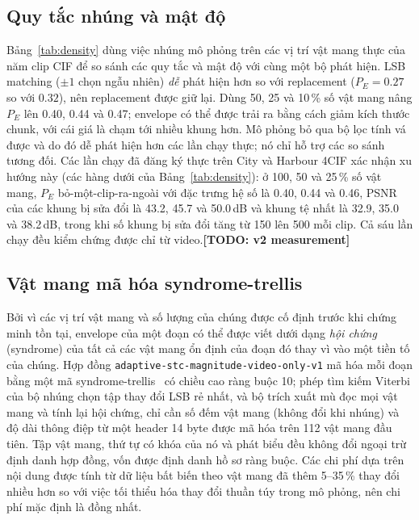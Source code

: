 \documentclass[journal]{IEEEtran}
\newcommand{\todo}[1]{\textbf{[TODO: #1]}}
\begin{document}
\subsection{Quy tắc nhúng và mật độ}
\label{sec:density}
Bảng~\ref{tab:density} dùng việc nhúng mô phỏng trên các vị trí vật mang thực
của năm clip CIF để so sánh các quy tắc và mật độ với cùng một bộ phát hiện.
LSB matching ($\pm1$ chọn ngẫu nhiên) \emph{dễ} phát hiện hơn so với
replacement ($P_E=0.27$ so với $0.32$), nên replacement được giữ lại. Dùng 50,
25 và 10\,\% số vật mang nâng $P_E$ lên 0.40, 0.44 và 0.47; envelope có thể được
trải ra bằng cách giảm kích thước chunk, với cái giá là chạm tới nhiều khung
hơn. Mô phỏng bỏ qua bộ lọc tính vá được và do đó dễ phát hiện hơn các lần chạy
thực; nó chỉ hỗ trợ các so sánh tương đối. Các lần chạy đã đăng ký thực trên
City và Harbour 4CIF xác nhận xu hướng này (các hàng dưới của
Bảng~\ref{tab:density}): ở 100, 50 và 25\,\% số vật mang, $P_E$
bỏ-một-clip-ra-ngoài với đặc trưng hệ số là 0.40, 0.44 và 0.46, PSNR của các
khung bị sửa đổi là 43.2, 45.7 và 50.0\,dB và khung tệ nhất là 32.9, 35.0 và
38.2\,dB, trong khi số khung bị sửa đổi tăng từ 150 lên 500 mỗi clip. Cả sáu
lần chạy đều kiểm chứng được chỉ từ video.\todo{v2 measurement}



\subsection{Vật mang mã hóa syndrome-trellis}
\label{sec:stc}
Bởi vì các vị trí vật mang và số lượng của chúng được cố định trước khi chứng
minh tồn tại, envelope của một đoạn có thể được viết dưới dạng \emph{hội chứng}
(syndrome) của tất cả các vật mang ổn định của đoạn đó thay vì vào một tiền tố
của chúng. Hợp đồng \texttt{adaptive-stc-magnitude-video-only-v1} mã hóa mỗi
đoạn bằng một mã syndrome-trellis~\cite{ref:stc} có chiều cao ràng buộc 10;
phép tìm kiếm Viterbi của bộ nhúng chọn tập thay đổi LSB rẻ nhất, và bộ trích
xuất mù đọc mọi vật mang và tính lại hội chứng, chỉ cần số đếm vật mang (không
đổi khi nhúng) và độ dài thông điệp từ một header 14 byte được mã hóa trên 112
vật mang đầu tiên. Tập vật mang, thứ tự có khóa của nó và phát biểu đều không
đổi ngoại trừ định danh hợp đồng, vốn được định danh hồ sơ ràng buộc. Các chi
phí dựa trên nội dung được tính từ dữ liệu bất biến theo vật mang đã thêm
5--35\,\% thay đổi nhiều hơn so với việc tối thiểu hóa thay đổi thuần túy trong
mô phỏng, nên chi phí mặc định là đồng nhất.
\end{document}
